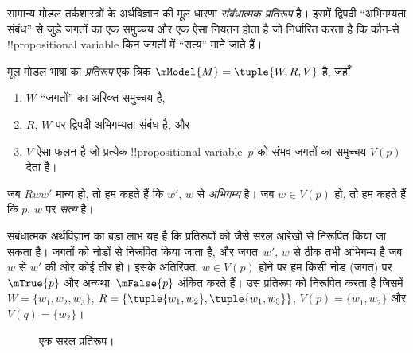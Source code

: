 \documentclass[../../../include/open-logic-section]{subfiles}
\begin{document}


सामान्य मोडल तर्कशास्त्रों के अर्थविज्ञान की मूल धारणा
\emph{संबंधात्मक प्रतिरूप} है। इसमें द्विपदी ``अभिगम्यता संबंध'' से जुड़े
जगतों का एक समुच्चय और एक ऐसा नियतन होता है जो निर्धारित करता है कि कौन-से
!!{propositional variable} किन जगतों में ``सत्य'' माने जाते हैं।

\begin{defn}
  मूल मोडल भाषा का \emph{प्रतिरूप} एक त्रिक $\mModel{M}
  = \tuple{W, R, V}$ है, जहाँ
  \begin{enumerate}
  \item $W$ ``जगतों'' का अरिक्त समुच्चय है,
  \item $R$, $W$ पर द्विपदी अभिगम्यता संबंध है, और
  \item $V$ ऐसा फलन है जो प्रत्येक !!{propositional variable}~$p$ को संभव जगतों
    का समुच्चय $V(p)$ देता है।
  \end{enumerate}
  जब $Rww'$ मान्य हो, तो हम कहते हैं कि $w'$, $w$ से \emph{अभिगम्य} है।
  जब $w \in V(p)$ हो, तो हम कहते हैं कि $p$, $w$ पर \emph{सत्य} है।
\end{defn}

संबंधात्मक अर्थविज्ञान का बड़ा लाभ यह है कि प्रतिरूपों को
 जैसे सरल आरेखों से निरूपित किया जा सकता है। जगतों को
नोडों से निरूपित किया जाता है, और जगत~$w'$, $w$ से ठीक तभी अभिगम्य है जब
$w$ से $w'$ की ओर कोई तीर हो। इसके अतिरिक्त, $w \in V(p)$ होने पर हम किसी
नोड (जगत) पर~$\mTrue{p}$ और अन्यथा~$\mFalse{p}$ अंकित करते हैं।
 उस प्रतिरूप को निरूपित करता है जिसमें
$W = \{w_1, w_2, w_3\}$, $R = \{\tuple{w_1, w_2},\tuple{w_1,
  w_3}\}$, $V(p) = \{w_1, w_2\}$ और $V(q) = \{w_2\}$।

\begin{figure}
  \begin{center}
  \end{center}
  \caption{एक सरल प्रतिरूप।}
\end{figure}
\end{document}
